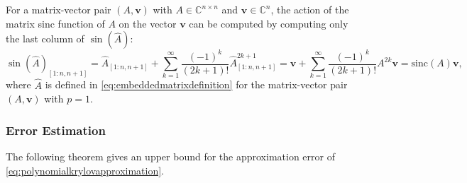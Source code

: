 \begin{corollary}
    \label{cor:embeddedmatrixsinc}
    For a matrix-vector pair $(A, \mathbf{v})$ with $A \in \mathbb{C}^{n \times n}$ and
    $\mathbf{v} \in \mathbb{C}^n$, the action of the matrix sinc function
    of $A$ on the vector $\mathbf{v}$ can be computed by computing only the last
    column of $\sin(\hat{A})$:
    \begin{equation*}
        \sin(\hat{A})_{[1 : n, n+1]}
        = \hat{A}_{[1 : n, n+1]} + \sum_{k=1}^{\infty}{\frac{(-1)^k}{(2k+1)!} \hat{A}_{[1 : n, n+1]}^{2k+1}}
        = \mathbf{v} + \sum_{k=1}^{\infty}{\frac{(-1)^k}{(2k+1)!} A^{2k} \mathbf{v}} = \mathrm{sinc}(A)\mathbf{v},
    \end{equation*}
    where $\hat{A}$ is defined in \eqref{eq:embeddedmatrixdefinition} for the matrix-vector
    pair $(A, \mathbf{v})$ with $p=1$.
\end{corollary}


\subsubsection{Error Estimation}
The following theorem gives an upper bound for the approximation error of
\eqref{eq:polynomialkrylovapproximation}.

